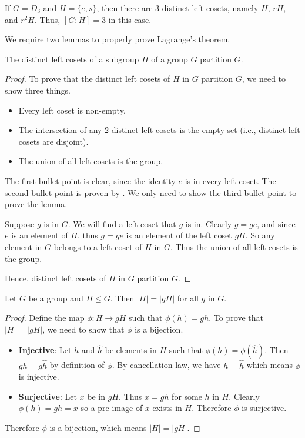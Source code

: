 \begin{example}
    If $G = D_3$ and $H = \{e, s\}$, then there are 3 distinct left cosets, namely $H$, $rH$, and $r^2H$. Thus, $[G:H] = 3$ in this case.
\end{example}

We require two lemmas to properly prove Lagrange's theorem.
\begin{lemma}\label{lemma-left-coset-partition}
    The distinct left cosets of a subgroup $H$ of a group $G$ partition $G$.
\end{lemma}
\begin{proof}
    To prove that the distinct left cosets of $H$ in $G$ partition $G$, we need to show three things.
    \begin{itemize}
        \item Every left coset is non-empty.
        \item The intersection of any 2 distinct left cosets is the empty set (i.e., distinct left cosets are disjoint).
        \item The union of all left cosets is the group.
    \end{itemize}
    The first bullet point is clear, since the identity $e$ is in every left coset. The second bullet point is proven by . We only need to show the third bullet point to prove the lemma.

    Suppose $g$ is in $G$. We will find a left coset that $g$ is in. Clearly $g = ge$, and since $e$ is an element of $H$, thus $g = ge$ is an element of the left coset $gH$. So any element in $G$ belongs to a left coset of $H$ in $G$. Thus the union of all left cosets is the group.

    Hence, distinct left cosets of $H$ in $G$ partition $G$.
\end{proof}

\begin{lemma}\label{lemma-order-of-coset}
    Let $G$ be a group and $H \leq G$. Then $|H| = |gH|$ for all $g$ in $G$.
\end{lemma}
\begin{proof}
    Define the map $\phi: H \to gH$ such that $\phi(h) = gh$. To prove that $|H| = |gH|$, we need to show that $\phi$ is a bijection.
    \begin{itemize}
        \item \textbf{Injective}: Let $h$ and $\hat{h}$ be elements in $H$ such that $\phi(h) = \phi(\hat{h})$. Then $gh = g\hat{h}$ by definition of $\phi$. By cancellation law, we have $h = \hat{h}$ which means $\phi$ is injective.
        \item \textbf{Surjective}: Let $x$ be in $gH$. Thus $x = gh$ for some $h$ in $H$. Clearly $\phi(h) = gh = x$ so a pre-image of $x$ exists in $H$. Therefore $\phi$ is surjective.
    \end{itemize}
    Therefore $\phi$ is a bijection, which means $|H| = |gH|$.
\end{proof}

